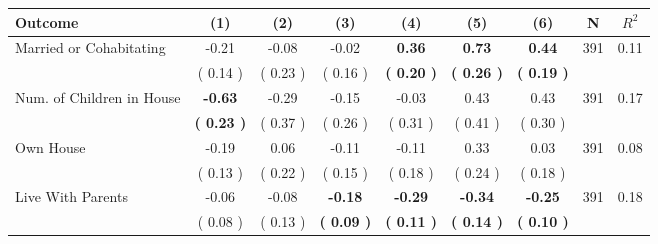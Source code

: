 \begin{tabular}{lcccccccc}
\toprule
 \textbf{Outcome} & \textbf{(1)} & \textbf{(2)} & \textbf{(3)} & \textbf{(4)} & \textbf{(5)} & \textbf{(6)} & \textbf{N} & \textbf{$ R^2$} \\
\midrule
Married or Cohabitating &     -0.21 &     -0.08 &     -0.02 & \textbf{     0.36} & \textbf{     0.73} & \textbf{     0.44} & 391 &       0.11 \\ 
 & (     0.14 ) & (     0.23 ) & (     0.16 ) & \textbf{(     0.20 )} & \textbf{(     0.26 )} & \textbf{(     0.19 )} & \\
Num. of Children in House & \textbf{    -0.63} &     -0.29 &     -0.15 &     -0.03 &      0.43 &      0.43 & 391 &       0.17 \\ 
 & \textbf{(     0.23 )} & (     0.37 ) & (     0.26 ) & (     0.31 ) & (     0.41 ) & (     0.30 ) & \\
Own House &     -0.19 &      0.06 &     -0.11 &     -0.11 &      0.33 &      0.03 & 391 &       0.08 \\ 
 & (     0.13 ) & (     0.22 ) & (     0.15 ) & (     0.18 ) & (     0.24 ) & (     0.18 ) & \\
Live With Parents &     -0.06 &     -0.08 & \textbf{    -0.18} & \textbf{    -0.29} & \textbf{    -0.34} & \textbf{    -0.25} & 391 &       0.18 \\ 
 & (     0.08 ) & (     0.13 ) & \textbf{(     0.09 )} & \textbf{(     0.11 )} & \textbf{(     0.14 )} & \textbf{(     0.10 )} & \\
\bottomrule
\end{tabular}
